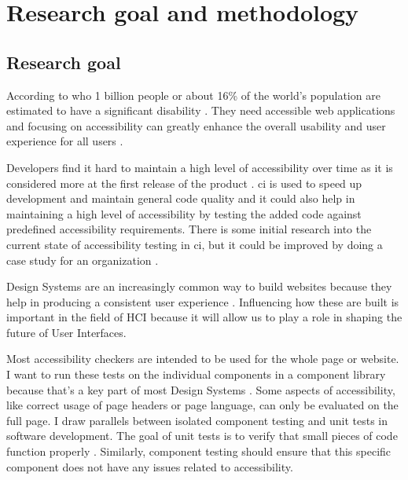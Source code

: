 \documentclass{master_thesis}
\begin{document}
\section{Research goal and methodology}
\subsection{Research goal}


According to \ac{who} 1 billion people or about 16\% of the world's population are estimated to have a significant disability \citep{WHO2022}. They need accessible web applications and focusing on accessibility can greatly enhance the overall usability and user experience for all users \citep{Miesenberger2020}.

Developers find it hard to maintain a high level of accessibility over time as it is considered more at the first release of the product \citep{Paterno2020}. \ac{ci} is used to speed up development and maintain general code quality \citep{Zhao2017} and it could also help in maintaining a high level of accessibility by testing the added code against predefined accessibility requirements. There is some initial research into the current state of accessibility testing in \ac{ci}, but it could be improved by doing a case study for an organization \citep{Sane2021}.

Design Systems are an increasingly common way to build websites because they help in producing a consistent user experience \citep{Yew2020}. Influencing how these are built is important in the field of HCI because it will allow us to play a role in shaping the future of User Interfaces.


Most accessibility checkers are intended to be used for the whole page or website. I want to run these tests on the individual components in a component library because that's a key part of most Design Systems \citep{Yew2020}. Some aspects of accessibility, like correct usage of page headers or page language, can only be evaluated on the full page. I draw parallels between isolated component testing and unit tests in software development. The goal of unit tests is to verify that small pieces of code function properly \citep[p.60]{Humble2010}. Similarly, component testing should ensure that this specific component does not have any issues related to accessibility.
\end{document}
